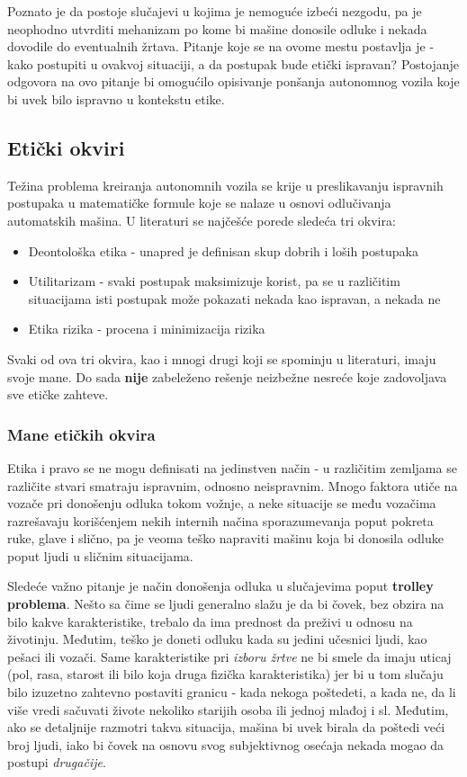 \documentclass[a4paper]{article}
\begin{document}
Poznato je da postoje slučajevi u kojima je nemoguće izbeći nezgodu, pa je neophodno utvrditi mehanizam po kome bi mašine donosile odluke i nekada dovodile do eventualnih žrtava. Pitanje koje se na ovome mestu postavlja je - kako postupiti u ovakvoj situaciji, a da postupak bude etički ispravan? Postojanje odgovora na ovo pitanje bi omogućilo opisivanje ponšanja autonomnog vozila koje bi uvek bilo ispravno u kontekstu etike.

\subsection{Etički okviri}
\label{subsec:Etički okviri}
Težina problema kreiranja autonomnih vozila se krije u preslikavanju ispravnih postupaka u matematičke formule koje se nalaze u osnovi odlučivanja automatskih mašina. U literaturi se najčešće porede sledeća tri okvira:
\begin{itemize}
 \item {Deontološka etika - unapred je definisan skup dobrih i loših postupaka}
 \item {Utilitarizam - svaki postupak maksimizuje korist, pa se u različitim situacijama isti postupak može pokazati nekada kao ispravan, a nekada ne }
 \item {Etika rizika - procena i minimizacija rizika}
\end{itemize}
Svaki od ova tri okvira, kao i mnogi drugi koji se spominju u literaturi, imaju svoje mane. Do sada \textbf{nije} zabeleženo rešenje neizbežne nesreće koje zadovoljava sve etičke zahteve. \cite{trolley_problem}

\subsubsection{Mane etičkih okvira}
\label{subsubsec:Mane etičkih okvira}
Etika i pravo se ne mogu definisati na jedinstven način - u različitim zemljama se različite stvari smatraju ispravnim, odnosno neispravnim. Mnogo faktora utiče na vozače pri donošenju odluka tokom vožnje, a neke situacije se među vozačima razrešavaju korišćenjem nekih internih načina sporazumevanja poput pokreta ruke, glave i slično, pa je veoma teško napraviti mašinu koja bi donosila odluke poput ljudi u sličnim situacijama.

Sledeće važno pitanje je način donošenja odluka u slučajevima poput \textbf{trolley problema}. Nešto sa čime se ljudi generalno slažu je da bi čovek, bez obzira na bilo kakve karakteristike, trebalo da ima prednost da preživi u odnosu na životinju. Međutim, teško je doneti odluku kada su jedini učesnici ljudi, kao pešaci ili vozači. Same karakteristike pri \emph{izboru žrtve} ne bi smele da imaju uticaj (pol, rasa, starost ili bilo koja druga fizička karakteristika) jer bi u tom slučaju bilo izuzetno zahtevno postaviti granicu - kada nekoga poštedeti, a kada ne, da li više vredi sačuvati živote nekoliko starijih osoba ili jednoj mlađoj i sl. Međutim, ako se detaljnije razmotri takva situacija, mašina bi uvek birala da poštedi veći broj ljudi, iako bi čovek na osnovu svog subjektivnog osećaja nekada mogao da postupi \emph{drugačije}.
\end{document}
